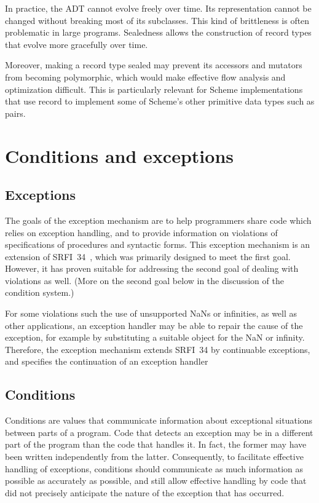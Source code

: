 \documentclass[twoside,twocolumn]{algol60}
\begin{document}
In practice, the ADT cannot evolve freely over time.  Its
representation cannot be changed without breaking most of its
subclasses.  This kind of brittleness is often problematic in
large programs.  Sealedness allows the construction of record types
that evolve more gracefully over time.

Moreover, making a record type sealed may prevent its accessors and
mutators from becoming polymorphic, which would make effective flow analysis and
optimization difficult.  This is particularly relevant for
Scheme implementations that use record to implement some of Scheme's
other primitive data types such as pairs.

\chapter{Conditions and exceptions}

\section{Exceptions}

The goals of the exception mechanism are to help programmers share
code which relies on exception handling, and to provide information on
violations of specifications of procedures and syntactic forms.  This
exception mechanism is an extension of SRFI~34~\cite{srfi34}, which
was primarily designed to meet the first goal.  However, it has proven
suitable for addressing the second goal of dealing with violations as
well.   (More on the second goal below in the discussion of the
condition system.)

For some violations such the use of unsupported NaNs or infinities, as
well as other applications, an exception handler may be able to
repair the cause of the exception, for example by substituting a
suitable object for the NaN or infinity.  Therefore, the exception
mechanism extends SRFI~34 by continuable exceptions, and specifies the
continuation of an exception handler

\section{Conditions}

Conditions are values that communicate information about exceptional
situations between parts of a program. Code that detects an exception
may be in a different part of the program than the code that handles
it. In fact, the former may have been written independently from the
latter.  Consequently, to facilitate effective handling of exceptions,
conditions should communicate as much information as possible as
accurately as possible, and still allow effective handling by code
that did not precisely anticipate the nature of the exception that has
occurred.
\end{document}
